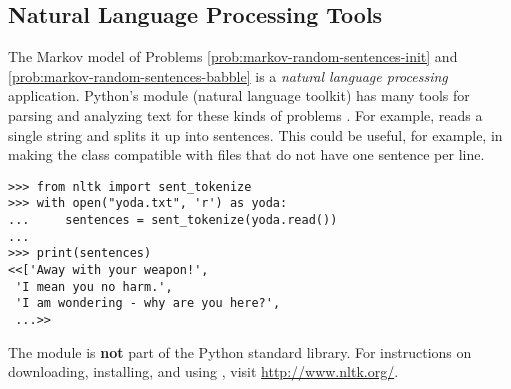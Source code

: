 \subsection*{Natural Language Processing Tools} %

The Markov model of Problems \ref{prob:markov-random-sentences-init} and \ref{prob:markov-random-sentences-babble} is a \emph{natural language processing} application.
Python's  module (natural language toolkit) has many tools for parsing and analyzing text for these kinds of problems \cite{bird2004nltk}.
For example,  reads a single string and splits it up into sentences.
This could be useful, for example, in making the  class compatible with files that do not have one sentence per line.

\begin{lstlisting}
>>> from nltk import sent_tokenize
>>> with open("yoda.txt", 'r') as yoda:
...     sentences = sent_tokenize(yoda.read())
...
>>> print(sentences)
<<['Away with your weapon!',
 'I mean you no harm.',
 'I am wondering - why are you here?',
 ...>>
\end{lstlisting}

The  module is \textbf{not} part of the Python standard library.
For instructions on downloading, installing, and using , visit \url{http://www.nltk.org/}.
